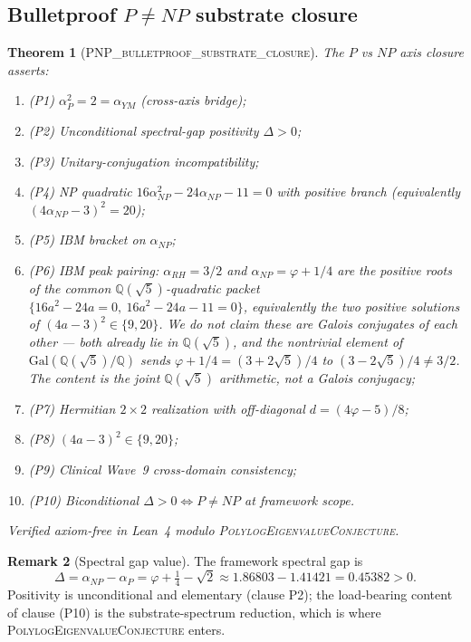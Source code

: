 \documentclass[11pt,a4paper]{amsart}
\theoremstyle{plain}
\newtheorem{theorem}{Theorem}[section]
\theoremstyle{definition}
\newtheorem{remark}[theorem]{Remark}
\newcommand{\Qr}{\mathbb{Q}}
\newcommand{\aP}{\alpha_{P}}
\newcommand{\aNP}{\alpha_{NP}}
\newcommand{\aRH}{\alpha_{RH}}
\newcommand{\aYM}{\alpha_{YM}}
\newcommand{\golden}{\varphi}
\newcommand{\LeanThm}[1]{\textsc{#1}}
\begin{document}
\subsection{Bulletproof $P\ne NP$ substrate closure}
\begin{theorem}[\LeanThm{PNP\_bulletproof\_substrate\_closure}]
\label{thm:pnp-closure}
The $P$ vs $NP$ axis closure asserts:
\begin{enumerate}
\item (P1) $\aP^2 = 2 = \aYM$ (cross-axis bridge);
\item (P2) Unconditional spectral-gap positivity $\Delta > 0$;
\item (P3) Unitary-conjugation incompatibility;
\item (P4) NP quadratic $16\aNP^2 - 24\aNP - 11 = 0$ with positive
branch (equivalently $(4\aNP - 3)^2 = 20$);
\item (P5) IBM bracket on $\aNP$;
\item (P6) IBM peak pairing: $\aRH = 3/2$ and $\aNP = \golden + 1/4$ are
the positive roots of the common $\Qr(\sqrt 5)$-quadratic packet
$\{16a^2 - 24a = 0,\ 16a^2 - 24a - 11 = 0\}$, equivalently the two
positive solutions of $(4a-3)^2 \in \{9, 20\}$. We do \emph{not} claim
these are Galois conjugates of each other --- both already lie in
$\Qr(\sqrt 5)$, and the nontrivial element of $\mathrm{Gal}(\Qr(\sqrt 5)/\Qr)$
sends $\golden + 1/4 = (3+2\sqrt 5)/4$ to $(3-2\sqrt 5)/4 \neq 3/2$. The
content is the joint $\Qr(\sqrt 5)$ arithmetic, not a Galois conjugacy;
\item (P7) Hermitian $2\times 2$ realization with off-diagonal
$d = (4\golden - 5)/8$;
\item (P8) $(4a-3)^2 \in \{9, 20\}$;
\item (P9) Clinical Wave~9 cross-domain consistency;
\item (P10) Biconditional $\Delta > 0 \iff P \ne NP$ at framework scope.
\end{enumerate}
Verified axiom-free in Lean~4 modulo
\LeanThm{PolylogEigenvalueConjecture}.
\end{theorem}

\begin{remark}[Spectral gap value]
The framework spectral gap is
\[
\Delta = \aNP - \aP = \golden + \tfrac{1}{4} - \sqrt 2
       \approx 1.86803 - 1.41421 = 0.45382 > 0.
\]
Positivity is unconditional and elementary (clause P2); the load-bearing
content of clause (P10) is the substrate-spectrum reduction, which is
where \LeanThm{PolylogEigenvalueConjecture} enters.
\end{remark}
\end{document}
